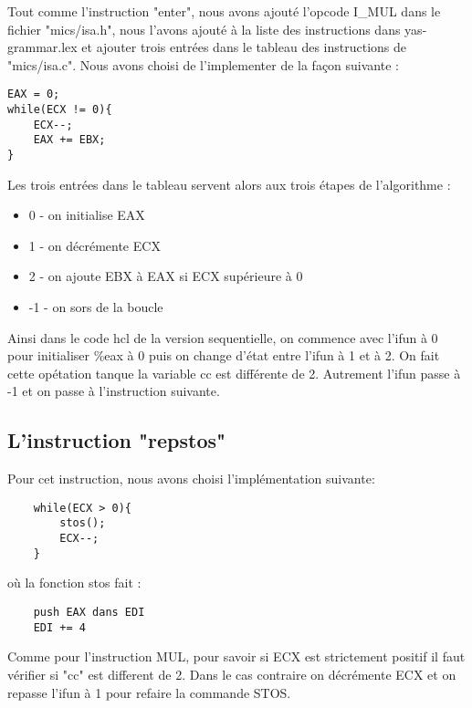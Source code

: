 \documentclass[12pt]{article}
\begin{document}
Tout comme l'instruction "enter", nous avons ajouté l'opcode I\_MUL dans le fichier "mics/isa.h", nous l'avons ajouté à la liste des instructions dans yas-grammar.lex et ajouter trois entrées dans le tableau des instructions de "mics/isa.c". Nous avons choisi de l'implementer de la façon suivante : 
\begin{verbatim}
EAX = 0;
while(ECX != 0){
    ECX--;
    EAX += EBX;
}
\end{verbatim}

Les trois entrées dans le tableau servent alors aux trois étapes de l'algorithme :

\begin{itemize}
	\item 0 - on initialise EAX
	\item 1 - on décrémente ECX
	\item 2 - on ajoute EBX à EAX si ECX supérieure à 0
	\item -1 - on sors de la boucle
\end{itemize}

Ainsi dans le code hcl de la version sequentielle, on commence avec l'ifun à 0 
pour initialiser \%eax à 0 puis on change d'état entre l'ifun à 1 et à 2. On fait cette opétation tanque la variable cc est différente de 2.
Autrement l'ifun passe à -1 et on passe à l'instruction suivante.

\subsection{L'instruction "repstos"}
Pour cet instruction, nous avons choisi l'implémentation suivante: 
\begin{verbatim}
    while(ECX > 0){
        stos();
        ECX--;
    }
\end{verbatim}

où la fonction stos fait :

\begin{verbatim}
    push EAX dans EDI
    EDI += 4
\end{verbatim}

Comme pour l'instruction MUL, pour savoir si ECX est strictement positif il faut vérifier si "cc" est different de 2. Dans le cas contraire on décrémente ECX et on repasse l'ifun à 1 pour refaire la commande STOS.
\end{document}
